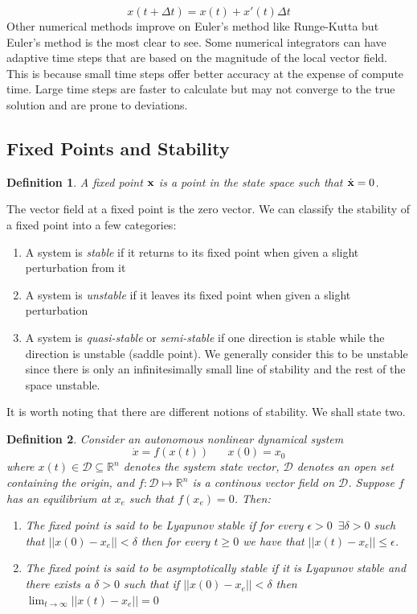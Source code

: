 \documentclass{article}
\newtheorem{definition}{Definition}[section]
\begin{document}
\begin{equation*}
    x(t+\Delta t) = x(t)+x'(t)\Delta t
\end{equation*}
Other numerical methods improve on Euler's method like Runge-Kutta but Euler's method is the most clear to see. Some numerical integrators can have adaptive time steps that are based on the magnitude of the local vector field. This is because small time steps offer better accuracy at the expense of compute time. Large time steps are faster to calculate but may not converge to the true solution and are prone to deviations. 
\subsection{Fixed Points and Stability}
\begin{definition}
    A \emph{fixed point} $\bold{x}$ is a point in the state space such that $\dot{\bold{x}} =0$. 
\end{definition}
The vector field at a fixed point is the zero vector. We can classify the stability of a fixed point into a few categories: 
\begin{enumerate}[label=(\roman*)]
    \item A system is \emph{stable} if it returns to its fixed point when given a slight perturbation from it 
    \item A system is \emph{unstable} if it leaves its fixed point when given a slight perturbation
    \item A system is \emph{quasi-stable} or \emph{semi-stable} if one direction is stable while the direction is unstable (saddle point). We generally consider this to be unstable since there is only an infinitesimally small line of stability and the rest of the space unstable.
\end{enumerate}
It is worth noting that there are different notions of stability. We shall state two.
\begin{definition}
    Consider an autonomous nonlinear dynamical system 
    \begin{equation*}
        \dot x =f(x(t)) \hspace{20pt} x(0)=x_0
    \end{equation*}
    where $x(t)\in \mathcal{D}\subseteq \mathbb{R}^n$ denotes the system state vector, $\mathcal{D}$ denotes an open set containing the origin, and $f:\mathcal{D} \mapsto \mathbb{R}^n$ is a continous vector field on $\mathcal D$. Suppose $f$ has an equilibrium at $x_e$ such that $f(x_e)=0$. Then:
    \begin{enumerate}[label=(\roman*)]
        \item The fixed point is said to be \emph{Lyapunov stable} if for every $\epsilon>0\,\,\, \exists\delta >0$ such that $||x(0)-x_e||<\delta $ then for every $t\geq0$ we have that $||x(t)-x_e|| \leq \epsilon$.
        \item The fixed point is said to be \emph{asymptotically stable} if it is Lyapunov stable and there exists a $\delta>0$ such that if $||x(0)-x_e||<\delta $ then $\lim_{t\rightarrow \infty}||x(t)-x_e||=0$
    \end{enumerate}
\end{definition}
\end{document}
